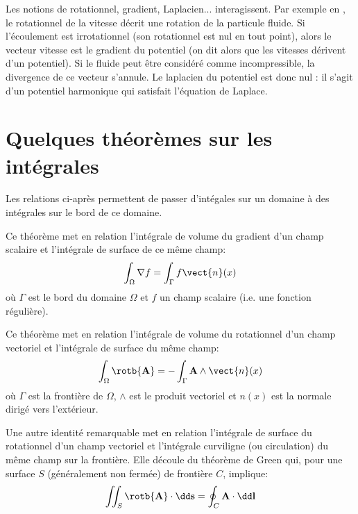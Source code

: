 \bigskip
Les notions de rotationnel, gradient, Laplacien... interagissent. Par exemple en
, le rotationnel de la vitesse décrit une rotation de la particule fluide.
Si l'écoulement est irrotationnel (son rotationnel est nul en tout point), alors le vecteur vitesse est le gradient du
potentiel (on dit alors que les vitesses dérivent d'un potentiel).
Si le fluide peut être considéré comme incompressible, la divergence de ce vecteur s'annule.
Le laplacien du potentiel est donc nul : il s'agit d'un potentiel harmonique qui satisfait l'équation de Laplace.

\medskip
\section{Quelques théorèmes sur les intégrales}

Les relations ci-après permettent de passer d'intégales sur un domaine à des
intégrales sur le bord de ce domaine.


\medskip
\begin{theoreme}

Ce théorème met en relation l'intégrale de volume du gradient d'un champ scalaire et l'intégrale
de surface de ce même champ:
 \begin{equation}
    \int_\Omega \nabla f = \int_\Gamma f \vect{n}(x)
\end{equation}
où $\Gamma$ est le bord du domaine $\Omega$ et $f$ un champ scalaire (i.e. une fonction régulière).
\end{theoreme}

\medskip
\begin{theoreme}

Ce théorème met en relation l'intégrale de volume du rotationnel d'un champ vectoriel et l'intégrale
de surface du même champ:
\begin{equation}
\int_\Omega \rotb  {\mathbf{A}} =
-\int_\Gamma {\mathbf{A} } \wedge \vect{n}(x)
\end{equation}
où $\Gamma$ est la frontière de $\Omega$, $\wedge$ est le produit vectoriel et $n(x)$ est
la normale dirigé vers l'extérieur.
\end{theoreme}

\medskip{}
Une autre identité remarquable met en relation l'intégrale de surface du rotationnel d'un champ vectoriel
et l'intégrale curviligne (ou circulation) du même champ sur la frontière.
Elle découle du théorème de Green qui, pour une surface $S$ (généralement non fermée) de
frontière $C$, implique:
\begin{equation}
\iint_S \rotb  {\mathbf{A}} \cdot \dd\mathbf{s} = \oint_C {\mathbf{A}} \cdot \dd\mathbf{l}
\end{equation}

